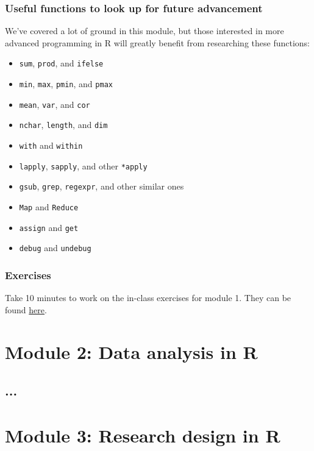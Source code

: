 \documentclass{beamer}
\begin{document}
\begin{frame}
    \frametitle{Useful functions to look up for future advancement}
    We've covered a lot of ground in this module,
    but those interested in more advanced programming in R
    will greatly benefit from researching these functions:\\
    
    \begin{itemize}
      \item \texttt{sum}, \texttt{prod}, and \texttt{ifelse}
      \item \texttt{min}, \texttt{max}, \texttt{pmin}, and \texttt{pmax}
      \item \texttt{mean}, \texttt{var}, and \texttt{cor}
      \item \texttt{nchar}, \texttt{length}, and \texttt{dim}
      \item \texttt{with} and \texttt{within}
      \item \texttt{lapply}, \texttt{sapply}, and other \texttt{*apply}
      \item \texttt{gsub}, \texttt{grep}, \texttt{regexpr}, and other similar ones 
      \item \texttt{Map} and \texttt{Reduce}
      \item \texttt{assign} and \texttt{get}
      \item \texttt{debug} and \texttt{undebug}
    \end{itemize}
\end{frame}


\begin{frame}
    \frametitle{Exercises}
    Take 10 minutes to work on the in-class exercises for module 1.
    They can be found \href{https://github.com/rnitulescu/RcourseOncology2020/blob/master/exercises1.R}{here}.
\end{frame}



\section{Module 2: Data analysis in R}

\subsection{...}




\section{Module 3: Research design in R}
\end{document}
